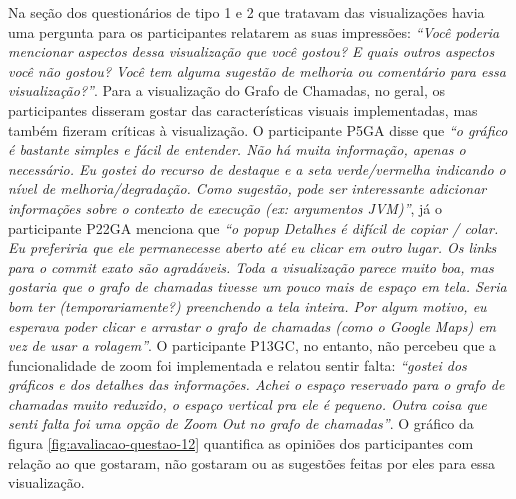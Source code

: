 Na seção dos questionários de tipo 1 e 2 que tratavam das visualizações havia uma pergunta para os participantes relatarem as suas impressões: \textit{``Você poderia mencionar aspectos dessa visualização que você gostou? E quais outros aspectos você não gostou? Você tem alguma sugestão de melhoria ou comentário para essa visualização?''}. Para a visualização do Grafo de Chamadas, no geral, os participantes disseram gostar das características visuais implementadas, mas também fizeram críticas à visualização. O participante P5GA disse que \textit{``o gráfico é bastante simples e fácil de entender. Não há muita informação, apenas o necessário. Eu gostei do recurso de destaque e a seta verde/vermelha indicando o nível de melhoria/degradação. Como sugestão, pode ser interessante adicionar informações sobre o contexto de execução (ex: argumentos JVM)''}, já o participante P22GA menciona que \textit{``o popup Detalhes é difícil de copiar / colar. Eu preferiria que ele permanecesse aberto até eu clicar em outro lugar. Os links para o commit exato são agradáveis. Toda a visualização parece muito boa, mas gostaria que o grafo de chamadas tivesse um pouco mais de espaço em tela. Seria bom ter (temporariamente?) preenchendo a tela inteira. Por algum motivo, eu esperava poder clicar e arrastar o grafo de chamadas (como o Google Maps) em vez de usar a rolagem''}. O participante P13GC, no entanto, não percebeu que a funcionalidade de zoom foi implementada e relatou sentir falta: \textit{``gostei dos gráficos e dos detalhes das informações. Achei o espaço reservado para o grafo de chamadas muito reduzido, o espaço vertical pra ele é pequeno. Outra coisa que senti falta foi uma opção de Zoom Out no grafo de chamadas''}. O gráfico da figura \ref{fig:avaliacao-questao-12} quantifica as opiniões dos participantes com relação ao que gostaram, não gostaram ou as sugestões feitas por eles para essa visualização.

